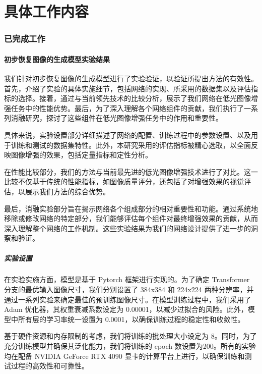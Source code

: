 \documentclass[a4paper]{ctexart}
\begin{document}
	\part*{具体工作内容}
	
	\section{已完成工作}
	
	\subsection{初步恢复图像的生成模型实验结果}
	
	我们针对初步恢复图像的生成模型进行了实验验证，以验证所提出方法的有效性。首先，介绍了实验的具体实施细节，包括网络的实现、所采用的数据集以及评估指标的选择。接着，通过与当前领先技术的比较分析，展示了我们网络在低光图像增强任务中的性能优势。最后，为了深入理解各个网络组件的贡献，我们执行了一系列消融研究，探讨了这些组件在低光图像增强任务中的作用和重要性。
	
	具体来说，实验设置部分详细描述了网络的配置、训练过程中的参数设置、以及用于训练和测试的数据集特性。此外，本研究采用的评估指标被精心选取，以全面反映图像增强的效果，包括定量指标和定性分析。
	
	在性能比较部分，我们的方法与当前最先进的低光图像增强技术进行了对比。这一比较不仅基于传统的性能指标，如图像质量评分，还包括了对增强效果的视觉评估，以展示我们方法的综合优势。
	
	最后，消融实验部分旨在揭示网络各个组成部分的相对重要性和功能。通过系统地移除或修改网络的特定部分，我们能够评估每个组件对最终增强效果的贡献，从而深入理解整个网络的工作机制。这些实验结果为我们的网络设计提供了进一步的洞察和验证。
	
	\subsubsection{实验设置}
	
	在实验实施方面，模型是基于 Pytorch 框架进行实现的。为了确定 Transformer 分支的最优输入图像尺寸，我们分别设置了 384x384 和 224x224 两种分辨率，并通过一系列实验来确定最佳的预训练图像尺寸。在模型训练过程中，我们采用了 Adam 优化器，其权重衰减系数设定为 0.00001，以减少过拟合的风险。此外，模型中所有层的学习率统一设置为 0.0001，以确保训练过程的稳定性和收敛性。
	
	基于硬件资源和内存限制的考虑，我们将训练的批处理大小设定为 8。同时，为了充分训练模型并确保其泛化能力，我们将训练的 epoch 数设置为200。所有的实验均在配备 NVIDIA GeForce RTX 4090 显卡的计算平台上进行，以确保训练和测试过程的高效性和可靠性。
	
\end{document}
